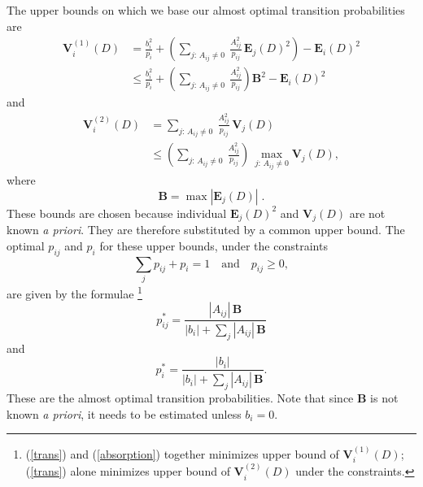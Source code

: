         The upper bounds on which we base our almost optimal transition
        probabilities are
        \[ \begin{split}
            \mathbf{V}_i^{(1)}(D)
            &= \frac{b_i^2}{p_i} + \left(\sum_{j:\,A_{ij}\ne0}\:
               \frac{A_{ij}^2}{p_{ij}}\, \mathbf{E}_j(D)^2\right)
               - \mathbf{E}_i(D)^2 \\
            &\le \frac{b_i^2}{p_i} + \left(\sum_{j:\,A_{ij}\ne0}\:
                             \frac{A_{ij}^2}{p_{ij}} \right) \mathbf{B}^2
                 - \mathbf{E}_i(D)^2
        \end{split} \]
        and
        \[ \begin{split}
            \mathbf{V}_i^{(2)}(D)
            &= \sum_{j:\,A_{ij}\ne0}\:
               \frac{A_{ij}^2}{p_{ij}}\, \mathbf{V}_j(D) \\
            &\le \left(\sum_{j:\,A_{ij}\ne0}\: \frac{A_{ij}^2}{p_{ij}}\right)\, 
               \max_{j:\,A_{ij}\ne0} \mathbf{V}_j(D),
        \end{split} \]
        where 
        \[ \mathbf{B} = \max |\mathbf{E}_j(D)| \;.
        \]
        These bounds are chosen because individual $\mathbf{E}_j(D)^2$ and
        $\mathbf{V}_j(D)$ are not known {\it a priori}.  They are therefore
        substituted by a common upper bound.  The optimal $p_{ij}$ and $p_i$
        for these upper bounds, under the constraints
        \[ \sum_j p_{ij} + p_i = 1\quad\mbox{and}\quad p_{ij}\ge 0, \]
        are given by the formulae
        \footnote{(\ref{trans}) and (\ref{absorption}) together minimizes
        upper bound of $\mathbf{V}_i^{(1)}(D)$; (\ref{trans}) alone minimizes
        upper bound of $\mathbf{V}_i^{(2)}(D)$ under the constraints.}
        \begin{equation} \label{trans}
            p_{ij}^* = \frac{|A_{ij}|\, \mathbf{B}}
                            {|b_i| + \sum_j |A_{ij}|\, \mathbf{B}}
        \end{equation}
        and
        \begin{equation} \label{absorption}
            p_i^* = \frac{|b_i|} {|b_i| + \sum_j |A_{ij}|\, \mathbf{B}}.
        \end{equation}
        These are the almost optimal transition probabilities.  Note that
        since $\mathbf{B}$ is not known {\it a priori},
        it needs to be estimated
        unless $b_i = 0$.
        
